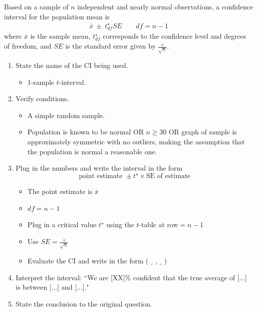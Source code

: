 
\begin{termBox}{
Based on a sample of $n$ independent and nearly normal observations, a confidence interval for the population mean is
\begin{eqnarray*}
\bar{x} \ \pm\  t^{\star}_{df}SE \quad \quad df=n-1
\end{eqnarray*}
where $\bar{x}$ is the sample mean, $t^{\star}_{df}$ corresponds to the confidence level and degrees of freedom, and $SE$ is the standard error given by $\frac{s}{\sqrt{n}}$.}
\end{termBox}

\begin{termBox}{\vspace{-1mm}
\begin{enumerate}
\setlength{\itemsep}{0mm}
\item State the name of the CI being used.\vspace{-1.5mm}
\begin{itemize}
\setlength{\itemsep}{0mm}
\item 1-sample $t$-interval.
\end{itemize}
\item Verify conditions.\vspace{-1.5mm}
\begin{itemize}
\setlength{\itemsep}{0mm}
\item A simple random sample.
\item Population is known to be normal OR $n\ge 30$ OR graph of sample is approximately symmetric with no outliers, making the assumption that the population is normal a reasonable one.
\end{itemize}
\item Plug in the numbers and write the interval in the form
$$\text{point estimate } \pm  t^\star \times \text{SE of estimate}$$
\begin{itemize}
\setlength{\itemsep}{0mm}
\item The point estimate is $\bar{x}$
\item $df = n-1$
\item Plug in a critical value $t^\star$ using the $t$-table at row$=n-1$
\item Use $SE = \frac{s}{\sqrt{n}}$
\item Evaluate the CI and write in the form ( $\_$ , $\_$ )
\end{itemize}
\item Interpret the interval:  ``We are [XX]\% confident that the true average of [...] is between [...] and [...]."
\item State the conclusion to the original question.
\end{enumerate}}
\end{termBox}

